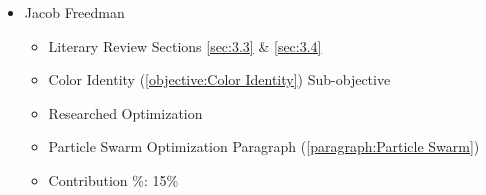 \documentclass[12pt, letterpaper]{article}
\begin{document}
\begin{itemize}
\item Jacob Freedman

\begin{itemize}

    \item Literary Review Sections \ref{sec:3.3} \& \ref{sec:3.4}
    \item Color Identity (\ref{objective:Color Identity}) Sub-objective
    \item Researched Optimization
    \item Particle Swarm Optimization Paragraph (\ref{paragraph:Particle Swarm})
    \item Contribution \%: 15\%

\end{itemize}

\end{itemize}
\end{document}
